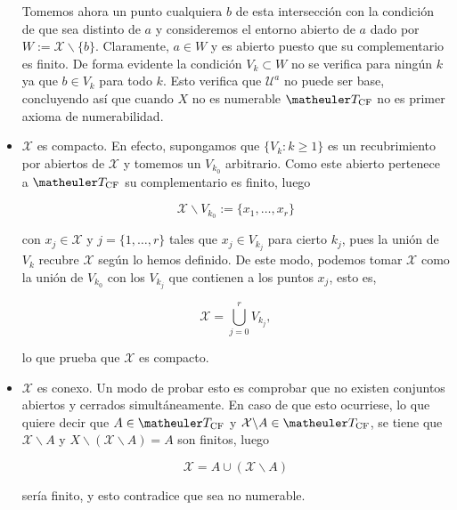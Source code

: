 \begin{itemize}
Tomemos ahora un punto cualquiera $b$ de esta intersección con la condición de que sea distinto de $a$ y consideremos el entorno abierto de $a$ dado por $W:=\mathcal{X}\backslash \{b\}$. Claramente, $a\in W$ y es abierto puesto que su complementario es finito.  De forma evidente la condición $V_k \subset W$ no se verifica para ningún $k$ ya que $b\in V_k$ para todo $k$. Esto verifica que $\mathcal{U}^a$ no puede ser base, concluyendo así que cuando $X$ no es numerable $\T_{\text{CF}}$ no es primer axioma de numerabilidad.

\item $\mathcal{X}$ es compacto. En efecto, supongamos que $\{V_k : k \geq 1\}$ es un recubrimiento por abiertos de $\mathcal{X}$ y tomemos un $V_{k_0}$ arbitrario. Como este abierto pertenece a $\T_{\text{CF}}$ su complementario es finito, luego 

\[\mathcal{X} \backslash V_{k_0} := \{x_1, \ldots, x_r\}\]

con $x_j \in \mathcal{X}$ y $j=\{1,\ldots, r\}$ tales que $x_j\in V_{k_j}$ para cierto $k_j$, pues la unión de $V_k$ recubre $\mathcal{X}$ según lo hemos definido. De este modo, podemos tomar $\mathcal{X}$ como la unión de $V_{k_0}$ con los $V_{k_j}$ que contienen a los puntos $x_j$, esto es,

\[\mathcal{X}=\bigcup_{j=0}^r V_{k_j},\]

lo que prueba que $\mathcal{X}$ es compacto. 

\item $\mathcal{X}$ es conexo. Un modo de probar esto es comprobar que no existen conjuntos abiertos y cerrados simultáneamente. En caso de que esto ocurriese, lo que quiere decir que $A\in \T_{\text{CF}}$ y $\mathcal{X}\backslash A \in \T_{\text{CF}}$, se tiene que $\mathcal{X} \backslash A$ y $X\backslash (\mathcal{X}\backslash A)=A$ son finitos, luego

\[\mathcal{X}=A \cup (\mathcal{X}\backslash A)\]

sería finito, y esto contradice que sea no numerable. 

\end{itemize}
